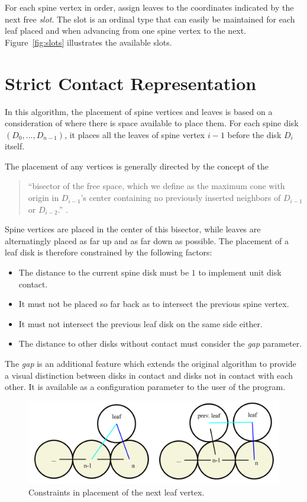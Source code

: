\documentclass[draft,final]{vutinfth} %
\begin{document}
For each spine vertex in order, assign leaves to the coordinates indicated by the next free \emph{slot}.
The slot is an ordinal type that can easily be maintained for each leaf placed and when advancing from one spine vertex to the next.
Figure~\ref{fig:slots} illustrates the available slots.

\section{Strict Contact Representation}

In this algorithm, the placement of spine vertices and leaves is based on a consideration of where there is space available to place them.
For each spine disk $(D_0, \ldots , D_{n-1})$, it places all the leaves of spine vertex $i-1$ before the disk $D_i$ itself.

The placement of any vertices is generally directed by the concept of the

\begin{quote}
``bisector of the free space, which we define as the maximum cone with origin in $D_{i-1}$'s center containing no previously inserted neighbors of $D_{i-1}$ or $D_{i-2}$.'' \cite{Klemz2015}.
\end{quote}

Spine vertices are placed in the center of this bisector, while leaves are alternatingly placed as far up and as far down as possible.
The placement of a leaf disk is therefore constrained by the following factors:

\begin{itemize}
    \item The distance to the current spine disk must be $1$ to implement unit disk contact.
    \item It must not be placed so far back as to intersect the previous spine vertex.
    \item It must not intersect the previous leaf disk on the same side either.
    \item The distance to other disks without contact must consider the \emph{gap} parameter.
\end{itemize}

The \emph{gap} is an additional feature which extends the original algorithm to provide a visual distinction between disks in contact and disks not in contact with each other. It is available as a configuration parameter to the user of the program.

\begin{figure}
    \centering
    \includegraphics[width=\textwidth]{graphics/strict_contact.png}
    \caption{Constraints in placement of the next leaf vertex.}
    \label{fig:strict_contact}
\end{figure}
\end{document}

